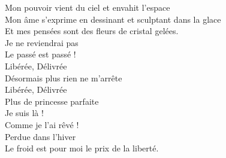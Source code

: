 \documentclass{novel}
\begin{document}
\begin{multicols}{2}
Mon pouvoir vient du ciel et envahit l'espace \\
Mon âme s'exprime en dessinant et sculptant dans la glace \\
Et mes pensées sont des fleurs de cristal gelées. \\

Je ne reviendrai pas \\
Le passé est passé ! \\

Libérée, Délivrée \\
Désormais plus rien ne m'arrête \\
Libérée, Délivrée \\
Plus de princesse parfaite \\
Je suis là ! \\
Comme je l'ai rêvé ! \\
Perdue dans l'hiver \\

Le froid est pour moi le prix de la liberté.
\end{multicols}
\end{document}
